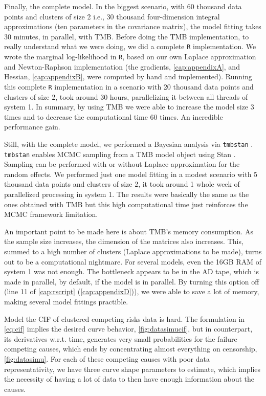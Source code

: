 Finally, the complete model. In the biggest scenario, with 60 thousand
data points and clusters of size 2 i.e., 30 thousand four-dimension
integral approximations (ten parameters in the covariance matrix), the
model fitting takes 30 minutes, in parallel, with TMB. Before doing the
TMB implementation, to really understand what we were doing, we did a
complete \texttt{R} implementation. We wrote the marginal log-likelihood
in \texttt{R}, based on our own Laplace approximation and Newton-Raphson
implementation (the gradients, \autoref{cap:appendixA}, and Hessian,
\autoref{cap:appendixB}, were computed by hand and implemented). Running
this complete \texttt{R} implementation in a scenario with 20 thousand
data points and clusters of size 2, took around 30 hours, parallelizing
it between all threads of system 1. In summary, by using TMB we were
able to increase the model size 3 times and to decrease the
computational time 60 times. An incredible performance gain.

Still, with the complete model, we performed a Bayesian analysis via
\texttt{tmbstan} \cite{tmbstan}. \texttt{tmbstan} enables MCMC sampling
\cite{MCMC, Diaconis} from a TMB model object using Stan \cite{Stan,
RStan}. Sampling can be performed with or without Laplace approximation
for the random effects. We performed just one model fitting in a modest
scenario with 5 thousand data points and clusters of size 2, it took
around 1 whole week of parallelized processing in system 1. The results
were basically the same as the ones obtained with TMB but this high
computational time just reinforces the MCMC framework limitation.

An important point to be made here is about TMB's memory consumption. As
the sample size increases, the dimension of the matrices also
increases. This, summed to a high number of clusters (Laplace
approximations to be made), turns out to be a computational
nightmare. For several models, even the 16GB RAM of system 1 was not
enough. The bottleneck appears to be in the AD tape, which is made in
parallel, by default, if the model is in parallel. By turning this
option off (line 11 of \autoref{cap:rscript} (\autoref{cap:appendixD})),
we were able to save a lot of memory, making several model fittings
practible.

Model the CIF of clustered competing risks data is hard. The formulation
in \autoref{eq:cif} implies the desired curve
behavior, \autoref{fig:datasimucif}, but in counterpart, its derivatives
w.r.t. time, generates very small probabilities for the failure
competing causes, which ends by concentrating almost everything on
censorship, \autoref{fig:datasimu}. For each of these competing causes
with poor data representativity, we have three curve shape parameters to
estimate, which implies the necessity of having a lot of data to then
have enough information about the causes.

